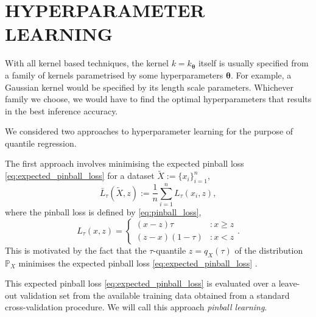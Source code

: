 \documentclass[twoside]{article} \usepackage{aistats2017}
\theoremstyle{definition}
\theoremstyle{theorem}
\newcommand{\rv}[1]{{#1}}
\newcommand{\ds}[1]{\tilde{#1}}
\begin{document}
\section{HYPERPARAMETER LEARNING}
\label{sec:hyperparameter_learning}

	With all kernel based techniques, the kernel $k = k_{\bm{\theta}}$ itself is usually specified from a family of kernels parametrised by some hyperparameters $\bm{\theta}$. For example, a Gaussian kernel would be specified by its length scale parameters. Whichever family we choose, we would have to find the optimal hyperparameters that results in the best inference accuracy. %
	
	We considered two approaches to hyperparameter learning for the purpose of quantile regression.
	
	The first approach involves minimising the expected pinball loss \eqref{eq:expected_pinball_loss} for a dataset $\ds{X} := \{x_{i}\}_{i = 1}^{n}$, 
	\begin{equation}
		\bar{L}_{\tau}(\ds{X}, z) := \frac{1}{n} \sum_{i = 1}^{n} L_{\tau}(x_{i}, z),
	\label{eq:expected_pinball_loss}
	\end{equation}
	where the pinball loss is defined by \eqref{eq:pinball_loss},
	\begin{equation}
		L_{\tau}(x, z) = \left\{ \begin{array}{lr}
			(x - z) \tau & : x \geq z \\
			(z - x) (1 - \tau) & : x < z
		\end{array} \right. .
	\label{eq:pinball_loss}
	\end{equation}
	This is motivated by the fact that the $\tau$-quantile $z = q_{\rv{X}}(\tau)$ of the distribution $\mathbb{P}_{\rv{X}}$ minimises the expected pinball loss \eqref{eq:expected_pinball_loss} \citep{koenker1978regression}.

	This expected pinball loss \eqref{eq:expected_pinball_loss} is evaluated over a leave-out validation set from the available training data obtained from a standard cross-validation procedure. We will call this approach \textit{pinball learning}.
\end{document}
